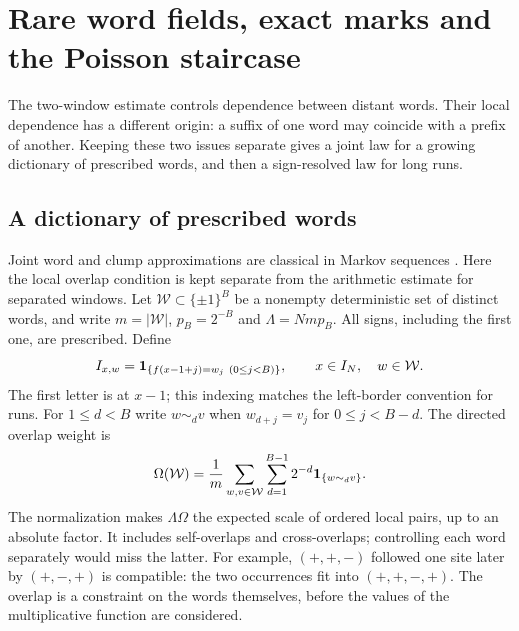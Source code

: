 \section{Rare word fields, exact marks and the Poisson staircase}
\label{sec:patterns-fields}
The two-window estimate controls dependence between distant words. Their
local dependence has a different origin: a suffix of one word may coincide
with a prefix of another. Keeping these two issues separate gives a joint
law for a growing dictionary of prescribed words, and then a sign-resolved
law for long runs.

\subsection{A dictionary of prescribed words}\label{sec:word-dictionaries}
Joint word and clump approximations are classical in Markov sequences
\cite{ReinertSchbath1998}. Here the local overlap condition is kept
separate from the arithmetic estimate for separated windows.
Let $\mathcal W\subset\{\pm1\}^B$ be a nonempty deterministic set of distinct
words, and write $m=|\mathcal W|$, $p_B=2^{-B}$ and $\Lambda=Nmp_B$.
All signs, including the first one, are prescribed. Define
\[
 I_{x,w}=\mathbf 1_{\{f(x-1+j)=w_j\ (0\le j<B)\}},
              \qquad x\in I_N,\quad w\in\mathcal W.
\]
The first letter is at $x-1$; this indexing matches the left-border
convention for runs.
For $1\le d<B$ write $w\mathrel{\sim_d}v$ when
$w_{d+j}=v_j$ for $0\le j<B-d$. The directed overlap weight is
\begin{equation}\label{eq:dictionary-overlap}
 \Omega(\mathcal W)=\frac1m\sum_{w,v\in\mathcal W}
                   \sum_{d=1}^{B-1}2^{-d}\mathbf 1_{\{w\sim_d v\}}.
\end{equation}
The normalization makes $\Lambda\Omega$ the expected scale of ordered
local pairs, up to an absolute factor. It includes self-overlaps and
cross-overlaps; controlling each word separately would miss the latter.
For example, $(+,+,-)$ followed one site later by $(+,-,+)$ is compatible:
the two occurrences fit into $(+,+,-,+)$. The overlap is a constraint on
the words themselves, before the values of the multiplicative function
are considered.

